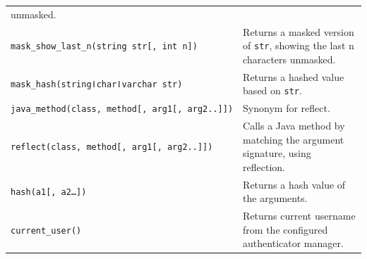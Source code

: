 \documentclass[
]{article}
\begin{document}
\begin{longtable}[]{@{}ll@{}}
\begin{minipage}[t]{0.55\columnwidth}
unmasked.\strut
\end{minipage}\tabularnewline
\begin{minipage}[t]{0.39\columnwidth}\raggedright
\texttt{mask\_show\_last\_n(string\ str{[},\ int\ n{]})}\strut
\end{minipage} & \begin{minipage}[t]{0.55\columnwidth}\raggedright
Returns a masked version of \texttt{str}, showing the last n characters
unmasked.\strut
\end{minipage}\tabularnewline
\begin{minipage}[t]{0.39\columnwidth}\raggedright
\texttt{mask\_hash(stringǀcharǀvarchar\ str)}\strut
\end{minipage} & \begin{minipage}[t]{0.55\columnwidth}\raggedright
Returns a hashed value based on \texttt{str}.\strut
\end{minipage}\tabularnewline
\begin{minipage}[t]{0.39\columnwidth}\raggedright
\texttt{java\_method(class,\ method{[},\ arg1{[},\ arg2..{]}{]})}\strut
\end{minipage} & \begin{minipage}[t]{0.55\columnwidth}\raggedright
Synonym for reflect.\strut
\end{minipage}\tabularnewline
\begin{minipage}[t]{0.39\columnwidth}\raggedright
\texttt{reflect(class,\ method{[},\ arg1{[},\ arg2..{]}{]})}\strut
\end{minipage} & \begin{minipage}[t]{0.55\columnwidth}\raggedright
Calls a Java method by matching the argument signature, using
reflection.\strut
\end{minipage}\tabularnewline
\begin{minipage}[t]{0.39\columnwidth}\raggedright
\texttt{hash(a1{[},\ a2\ldots{}{]})}\strut
\end{minipage} & \begin{minipage}[t]{0.55\columnwidth}\raggedright
Returns a hash value of the arguments.\strut
\end{minipage}\tabularnewline
\begin{minipage}[t]{0.39\columnwidth}\raggedright
\texttt{current\_user()}\strut
\end{minipage} & \begin{minipage}[t]{0.55\columnwidth}\raggedright
Returns current username from the configured authenticator
manager.\strut
\end{minipage}\tabularnewline

\end{longtable}
\end{document}

